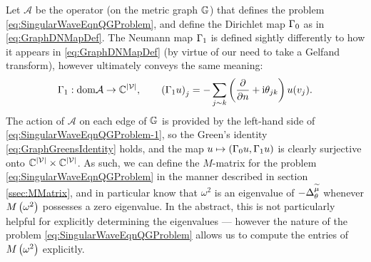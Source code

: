 Let $\mathcal{A}$ be the operator (on the metric graph $\mathbb{G}$) that defines the problem \eqref{eq:SingularWaveEqnQGProblem}, and define the Dirichlet map $\Gamma_0$ as in \eqref{eq:GraphDNMapDef}.
The Neumann map $\Gamma_1$ is defined sightly differently to how it appears in \eqref{eq:GraphDNMapDef} (by virtue of our need to take a Gelfand transform), however ultimately conveys the same meaning:
\begin{align} \label{eq:GraphNMapQM}
	\Gamma_1:\mathrm{dom}\mathcal{A} \rightarrow \mathbb{C}^{\left\lvert \mathcal{V} \right\rvert}, \qquad
	\left( \Gamma_1 u \right)_j = -\sum_{j\sim k} \left( \dfrac{\partial }{\partial n} + \mathrm{i}\theta_{jk}  \right)u(v_j).
\end{align}
The action of $\mathcal{A}$ on each edge of $\mathbb{G}$ is provided by the left-hand side of \eqref{eq:SingularWaveEqnQGProblem-1}, so the Green's identity \eqref{eq:GraphGreensIdentity} holds, and the map $u\mapsto\left( \Gamma_0 u, \Gamma_1 u \right)$ is clearly surjective onto $\mathbb{C}^{\left\lvert \mathcal{V} \right\rvert}\times\mathbb{C}^{\left\lvert \mathcal{V} \right\rvert}$.
As such, we can define the $M$-matrix for the problem \eqref{eq:SingularWaveEqnQGProblem} in the manner described in section \ref{ssec:MMatrix}, and in particular know that $\omega^2$ is an eigenvalue of $-\Delta_{\theta}^{\widetilde{\mu}}$ whenever $M\left( \omega^2 \right)$ possesses a zero eigenvalue.
In the abstract, this is not particularly helpful for explicitly determining the eigenvalues --- however the nature of the problem \eqref{eq:SingularWaveEqnQGProblem} allows us to compute the entries of $M\left( \omega^2 \right)$ explicitly.

